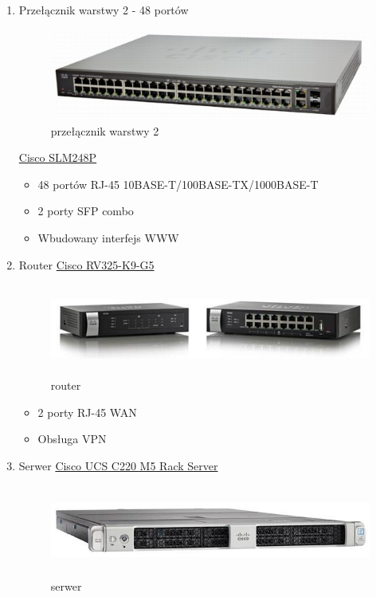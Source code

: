 \documentclass{article}
\begin{document}
\begin{enumerate}
		\item Przełącznik warstwy 2 - 48 portów
		\begin{figure}[!ht]	
		\centering
		\includegraphics[height=3cm]{2.jpg}
		\caption{przełącznik warstwy 2}
		\label{fig:obrazek 3}
	\end{figure}
	\href{https://www.cisco.com/c/en/us/products/collateral/switches/slm248p-48-port-10-100-2-port-gigabit-smart-switch-sfps-poe/data_sheet_c78-501235.html}{Cisco SLM248P}
	\begin{itemize}
		\item 48 portów RJ-45 10BASE-T/100BASE-TX/1000BASE-T
		\item 2 porty SFP combo
		\item Wbudowany interfejs WWW
	\end{itemize}
	\item Router
	\href{ https://www.cisco.com/c/en/us/products/collateral/routers/rv325-dual-gigabit-wan-vpn-router/datasheet-c78-729726.html}{Cisco RV325-K9-G5}
		\begin{figure}[!ht]	
		\centering
		\includegraphics[height=3cm]{3.jpg}
		\caption{router}
		\label{fig:obrazek 4}
	\end{figure}
	\begin{itemize}
		\item 2 porty RJ-45 WAN
		\item Obsługa VPN
	\end{itemize}
	
	\item Serwer
\href{ https://www.cisco.com/c/en/us/products/collateral/servers-unified-computing/ucs-c-series-rack-servers/datasheet-c78-739281.html}{Cisco UCS C220 M5 Rack Server}
		\begin{figure}[!ht]	
		\centering
		\includegraphics[height=3cm]{4.jpg}
		\caption{serwer}
		\label{fig:obrazek 5}
	\end{figure}
	

\end{enumerate}
\end{document}
